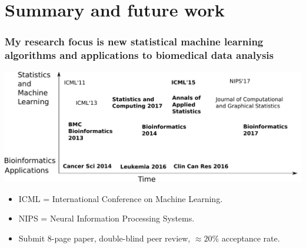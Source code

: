 \documentclass{beamer}
\begin{document}
\section{Summary and future work}

\begin{frame}
  \frametitle{My research focus is new statistical machine learning algorithms and applications to biomedical data analysis}
  \includegraphics[width=\textwidth]{timeline-SteJustine}

  \begin{itemize}
  \item ICML = International Conference on Machine Learning.
  \item NIPS = Neural Information Processing Systems.
  \item Submit 8-page paper, double-blind peer review, $\approx 20\%$ acceptance
    rate.
  \end{itemize}
\end{frame}
\end{document}
